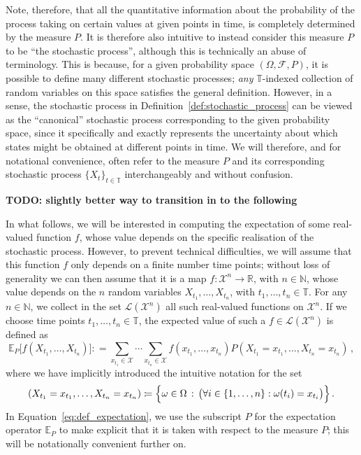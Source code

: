 \documentclass[11pt]{book}
\newcommand{\nats}{\mathbb{N}}
\newcommand{\reals}{\mathbb{R}}
\newcommand{\states}{\mathcal{X}}
\newcommand{\gambles}{\mathcal{L}}
\newcommand{\coloneqq}{:\!=}
\newcommand{\timedim}{\mathbb{T}}
\begin{document}
Note, therefore, that all the quantitative information about the probability of the process taking on certain values at given points in time, is completely determined by the measure $P$. It is therefore also intuitive to instead consider this measure $P$ to be ``the stochastic process'', although this is technically an abuse of terminology. This is because, for a given probability space $(\Omega,\mathcal{F},P)$, it is possible to define many different stochastic processes; \emph{any} $\timedim$-indexed collection of random variables on this space satisfies the general definition. However, in a sense, the stochastic process in Definition~\ref{def:stochastic_process} can be viewed as the ``canonical'' stochastic process corresponding to the given probability space, since it specifically and exactly represents the uncertainty about which states might be obtained at different points in time. We will therefore, and for notational convenience, often refer to the measure $P$ and its corresponding stochastic process $\{X_t\}_{t\in\timedim}$ interchangeably and without confusion.

{\bf TODO: slightly better way to transition in to the following}

In what follows, we will be interested in computing the expectation of some real-valued function $f$, whose value depends on the specific realisation of the stochastic process. However, to prevent technical difficulties, we will assume that this function $f$ only depends on a finite number time points; without loss of generality we can then assume that it is a map $f:\states^n\to\reals$, with $n\in\nats$, whose value depends on the $n$ random variables $X_{t_1},\ldots,X_{t_{n}}$, with $t_1,\ldots,t_{n}\in\timedim$. For any $n\in\nats$, we collect in the set $\gambles(\states^n)$ all such real-valued functions on $\states^n$. If we choose time points $t_1,\ldots,t_{n}\in\timedim$, the expected value of such a $f\in\gambles(\states^n)$ is defined as
\begin{equation}\label{eq:def_expectation}
\mathbb{E}_P\bigr[f(X_{t_1},\ldots,X_{t_n})\bigr] \coloneqq \sum_{x_{t_1}\in\states}\cdots\sum_{x_{t_n}\in\states} f(x_{t_1},\ldots,x_{t_n}) P(X_{t_1}=x_{t_1},\ldots,X_{t_n}=x_{t_n})\,,
\end{equation}
where we have implicitly introduced the intuitive notation for the set
\begin{equation*}
(X_{t_1}=x_{t_1},\ldots,X_{t_n}=x_{t_n}) \coloneqq \Bigl\{\omega\in\Omega\,:\,\bigl(\forall i\in\{1,\ldots,n\}:\omega(t_i)=x_{t_i}\bigr)\Bigr\}\,.
\end{equation*}
In Equation~\eqref{eq:def_expectation}, we use the subscript $P$ for the expectation operator $\mathbb{E}_P$ to make explicit that it is taken with respect to the measure $P$; this will be notationally convenient further on.
\end{document}
